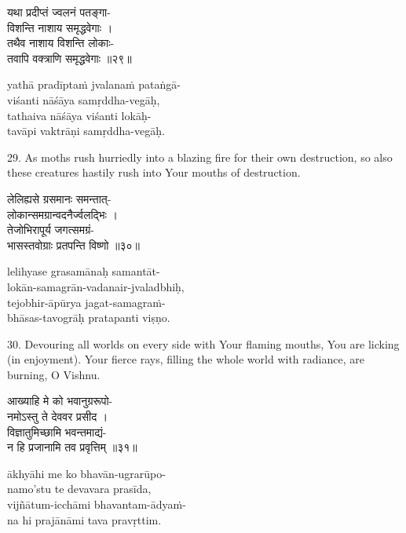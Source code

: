 \begin{gitaverse}
यथा प्रदीप्तं ज्वलनं पतङ्गा- \\
\tab विशन्ति नाशाय समृद्धवेगाः । \\
तथैव नाशाय विशन्ति लोकाः- \\
\tab तवापि वक्त्राणि समृद्धवेगाः ॥२९॥
\end{gitaverse}

\begin{transliteration}
yathā pradīptaṁ jvalanaṁ pataṅgā- \\
\tab viśanti nāśāya samṛddha-vegāḥ, \\
tathaiva nāśāya viśanti lokāḥ- \\
\tab tavāpi vaktrāṇi samṛddha-vegāḥ.
\end{transliteration}

29. As moths rush hurriedly into a blazing fire for their own destruction, so
also these creatures hastily rush into Your mouths of destruction.

\begin{gitaverse}
लेलिह्यसे ग्रसमानः समन्तात्- \\
\tab लोकान्समग्रान्वदनैर्ज्वलद्भिः । \\
तेजोभिरापूर्य जगत्समग्रं- \\
\tab भासस्तवोग्राः प्रतपन्ति विष्णो ॥३०॥
\end{gitaverse}

\begin{transliteration}
lelihyase grasamānaḥ samantāt- \\
\tab lokān-samagrān-vadanair-jvaladbhiḥ, \\
tejobhir-āpūrya jagat-samagraṁ- \\
\tab bhāsas-tavogrāḥ pratapanti viṣṇo.
\end{transliteration}

30. Devouring all worlds on every side with Your flaming mouths, You are
licking (in enjoyment). Your fierce rays, filling the whole world with
radiance, are burning, O Vishnu.

\begin{gitaverse}
आख्याहि मे को भवानुग्ररूपो- \\
\tab नमोऽस्तु ते देववर प्रसीद । \\
विज्ञातुमिच्छामि भवन्तमाद्यं- \\
\tab न हि प्रजानामि तव प्रवृत्तिम् ॥३१॥
\end{gitaverse}

\begin{transliteration}
ākhyāhi me ko bhavān-ugrarūpo- \\
\tab namo'stu te devavara prasīda, \\
vijñātum-icchāmi bhavantam-ādyaṁ- \\
\tab na hi prajānāmi tava pravṛttim.
\end{transliteration}

